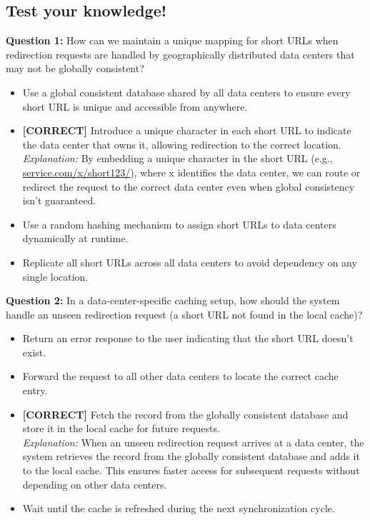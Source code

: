 \subsection*{Test your knowledge!}
\vspace{0.3cm}
\noindent
\textbf{Question 1:} How can we maintain a unique mapping for short URLs when redirection requests are handled by geographically distributed data centers that may not be globally consistent?
\\[0.2cm]
\begin{itemize}
 \item Use a global consistent database shared by all data centers to ensure every short URL is unique and accessible from anywhere.
 \item \textbf{[CORRECT]} Introduce a unique character in each short URL to indicate the data center that owns it, allowing redirection to the correct location.
\\[0.1cm]
\textit{Explanation:} 
By embedding a unique character in the short URL (e.g., \href{http://service.com/x/short123/}{service.com/x/short123/}), where x identifies the data center, we can route or redirect the request to the correct data center even when global consistency isn't guaranteed.
 \item Use a random hashing mechanism to assign short URLs to data centers dynamically at runtime.
 \item Replicate all short URLs across all data centers to avoid dependency on any single location.
\end{itemize}
\vspace{0.3cm}
\noindent
\textbf{Question 2:} In a data-center-specific caching setup, how should the system handle an unseen redirection request (a short URL not found in the local cache)?
\\[0.2cm]
\begin{itemize}
 \item Return an error response to the user indicating that the short URL doesn't exist.
 \item Forward the request to all other data centers to locate the correct cache entry.
 \item \textbf{[CORRECT]} Fetch the record from the globally consistent database and store it in the local cache for future requests.
\\[0.1cm]
\textit{Explanation:} 
When an unseen redirection request arrives at a data center, the system retrieves the record from the globally consistent database and adds it to the local cache. This ensures faster access for subsequent requests without depending on other data centers.
 \item Wait until the cache is refreshed during the next synchronization cycle.
\end{itemize}
